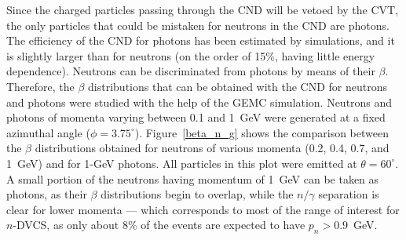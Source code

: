 Since the charged particles passing through the CND will be vetoed by the CVT, the only particles that could be mistaken for neutrons in the CND are photons. The efficiency of the CND for photons has been estimated by simulations, and it is slightly larger than for neutrons (on the order of 15\%, having little energy dependence). 
Neutrons can be discriminated from photons by means of their $\beta$.
Therefore, the $\beta$ distributions that can be obtained with the CND for neutrons and photons were studied with the help of the GEMC simulation. Neutrons and photons of momenta varying between 0.1 and 1~GeV were generated at a fixed azimuthal angle ($\phi = 3.75^\circ$).
%
%
%
%
Figure~\ref{beta_n_g} shows the comparison between the $\beta$ distributions obtained for neutrons of various momenta (0.2, 0.4, 0.7, and 1~GeV) and for 1-GeV photons. All particles in this plot were emitted at $\theta = 60^\circ$.
A small portion of the neutrons having momentum of 1~GeV can be taken as photons, as their $\beta$ distributions begin to overlap, while the $n/\gamma$ separation is clear for lower momenta --- which corresponds to most of the range of interest for $n$-DVCS, as only about 8\% of the events are expected to have $p_n>0.9$~GeV.
%
